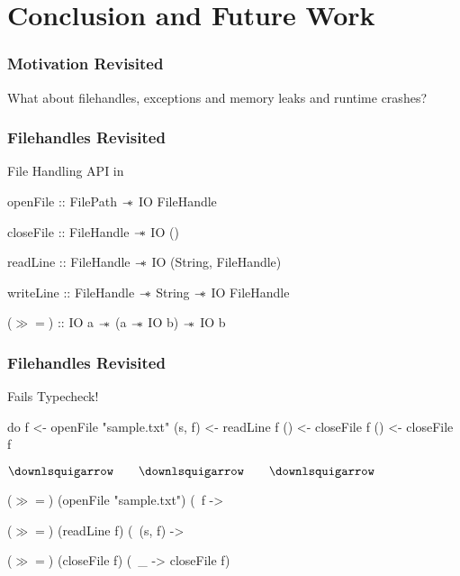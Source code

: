 \section{Conclusion and Future Work}\label{sec:conclusion}

\begin{frame}[fragile, c]
  \frametitle{Motivation Revisited}
  \begin{center}
    {\LARGE
      What about filehandles, exceptions and memory leaks and runtime crashes?
    }
\end{center}

\end{frame}

\begin{frame}[fragile, c]
  \frametitle{Filehandles Revisited}
  \begin{center}
  File Handling API in \qub{}
  \begin{haskell}
     openFile  :: FilePath   $\mathrel{-\mkern-6mu*}$ IO FileHandle

     closeFile :: FileHandle $\mathrel{-\mkern-6mu*}$ IO ()

     readLine  :: FileHandle $\mathrel{-\mkern-6mu*}$ IO (String, FileHandle)

     writeLine :: FileHandle $\mathrel{-\mkern-6mu*}$ String
                             $\mathrel{-\mkern-6mu*}$ IO FileHandle




     ($\gg\!=$) :: IO a $\mathrel{-\mkern-6mu*}$ (a $\mathrel{-\mkern-6mu*}$ IO b) $\mathrel{-\mkern-6mu*}$ IO b
   \end{haskell}
\end{center}
\end{frame}

\begin{frame}[fragile, c]
  \frametitle{Filehandles Revisited}
  \begin{center}
  {\LARGE \color{white}Fails Typecheck!}

  \begin{haskell}
               do f  <- openFile "sample.txt"
                  (s, f)  <- readLine f
                  () <- closeFile f
                  () <- closeFile f
            \end{haskell}
{\LARGE      $\downlsquigarrow \qquad \downlsquigarrow \qquad \downlsquigarrow$}
            \begin{haskell}
               ($\gg\!=$) (openFile "sample.txt") (\ f ->

               ($\gg\!=$) (readLine f) (\ (s, f) ->

               ($\gg\!=$) (closeFile f) (\ _ -> closeFile f)
            \end{haskell}
          \end{center}

\end{frame}


